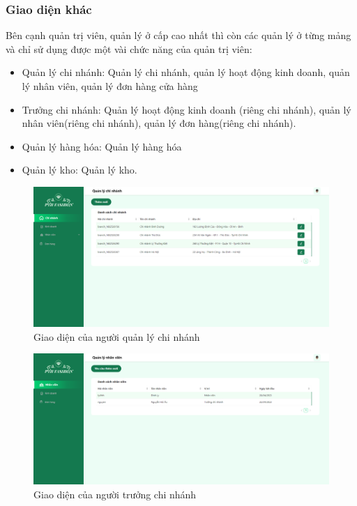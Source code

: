 \subsubsection{Giao diện khác}
Bên cạnh quản trị viên, quản lý ở cấp cao nhất thì còn các quản lý ở từng mảng và chỉ sử dụng được một vài chức năng của quản trị viên:
\begin{itemize}
    \item Quản lý chi nhánh: Quản lý chi nhánh, quản lý hoạt động kinh doanh, quản lý nhân viên, quản lý đơn hàng cửa hàng
    \item Trưởng chi nhánh: Quản lý hoạt động kinh doanh (riêng chi nhánh), quản lý nhân viên(riêng chi nhánh), quản lý đơn hàng(riêng chi nhánh).
    \item Quản lý hàng hóa: Quản lý hàng hóa
    \item Quản lý kho: Quản lý kho.
\end{itemize}
\begin{figure}[!htp]
    \centering
    \includegraphics[width=12cm]{img/UI/admin_implement/branchManager.png}
    \newline
    \caption{Giao diện của người quản lý chi nhánh}
\end{figure}

\begin{figure}[!htp]
    \centering
    \includegraphics[width=12cm]{img/UI/admin_implement/branchLeader.png}
    \newline
    \caption{Giao diện của người trưởng chi nhánh}
\end{figure}
\newpage


